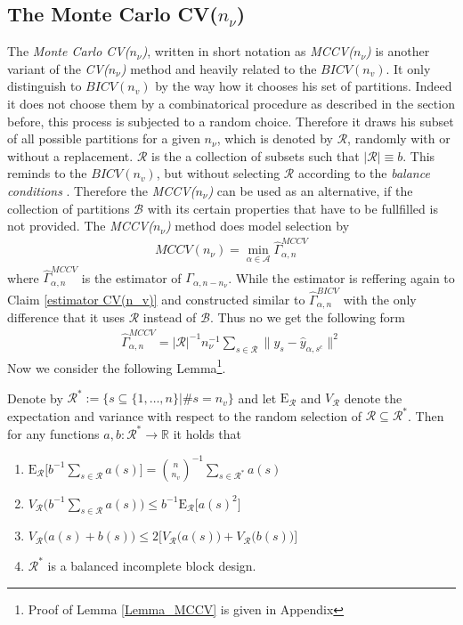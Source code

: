 \documentclass[Research_Module_ES.tex]{subfiles}
\begin{document}
\subsection{The Monte Carlo CV($n_\nu$)}

The \textit{Monte Carlo CV($n_\nu$)}, written in short notation as \textit{MCCV($n_\nu$)} is another variant of the \textit{CV($n_\nu$)} method and heavily related to the $BICV(n_v)$. It only distinguish to $BICV(n_v)$ by the way how it chooses his set of partitions. Indeed it does not choose them by a combinatorical procedure as described in the section before, this process is subjected to a random choice. Therefore it draws his subset of all possible partitions for a given $n_\nu$, which is denoted by $\mathcal{R}$, randomly with or without a replacement. $\mathcal{R}$ is the a collection of subsets such that $|\mathcal{R}|\equiv b$. This reminds to the $BICV(n_v)$, but without selecting $\mathcal{R}$ according to the \textit{balance conditions} . Therefore the \textit{MCCV($n_\nu$)} can be used as an alternative, if the collection of partitions $\mathcal{B}$ with its certain properties that have to be fullfilled is not provided. The \textit{MCCV($n_\nu$)} method does model selection by 
\begin{align*}
MCCV(n_\nu)=\min_{\alpha\in\mathcal{A}}\hat{\Gamma}_{\alpha,n}^{MCCV}
\end{align*}
where $\hat{\Gamma}_{\alpha,n}^{MCCV}$ is the estimator of $\Gamma_{\alpha,n-n_\nu}$. While the estimator is reffering again to Claim \ref{estimator CV(n_v)} and constructed similar to $\hat{\Gamma}_{\alpha,n}^{BICV}$ with the only difference that it uses $\mathcal{R}$ instead of $\mathcal{B}$. Thus no we get the following form
\begin{align*}
\hat{\Gamma}_{\alpha,n}^{MCCV}=|\mathcal{R}|^{-1}n_\nu^{-1}\sum_{s\in\mathcal{R}}\parallel y_s-\hat{y}_{\alpha,s^c}\parallel^2
\end{align*}
Now we consider the following Lemma\footnote{Proof of Lemma \ref{Lemma_MCCV} is given in Appendix }.
\begin{lemma}
	\label{Lemma_MCCV}
Denote by $\mathcal{R}^\ast:= \{s\subseteq\{1,\dots,n\}|\# s=n_v\}$ and let $\mathrm{E}_\mathcal{R}$ and $V_\mathcal{R}$ denote the expectation and variance with respect to the random selection of $\mathcal{R}\subseteq\mathcal{R}^\ast$. Then for any functions $a,b:\mathcal{R}^\ast\to \mathbb{R}$ it holds that
\begin{enumerate}
\item $\mathrm{E}_\mathcal{R} \bigl[ b^{-1}\sum_{s\in \mathcal{R}}a(s)\bigr] = \binom{n}{n_v}^{-1}\sum_{s\in\mathcal{R}^\ast}a(s)$
\item $V_\mathcal{R} \bigl( b^{-1}\sum_{s\in \mathcal{R}}a(s)\bigr) \le b^{-1} \mathrm{E}_\mathcal{R} \bigl[a(s)^2\bigr]$
\item $V_\mathcal{R}\bigl(a(s)+b(s)\bigr) \le 2\bigl[V_\mathcal{R}\bigl(a(s)\bigr)+V_\mathcal{R}\bigl(b(s)\bigr)\bigr]$
\item $\mathcal{R}^\ast$ is a balanced incomplete block design.
\end{enumerate}
\end{lemma}
\end{document}
